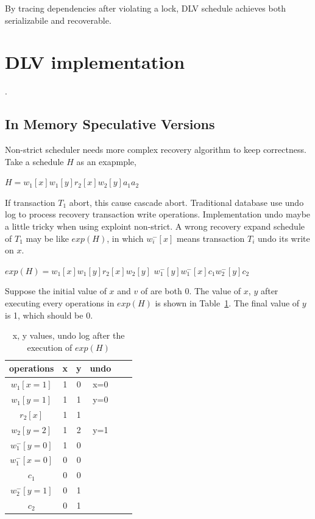 \documentclass[conference]{IEEEtran}
\begin{document}
By tracing dependencies after violating a lock, DLV schedule achieves both serializabile and recoverable.

\section{DLV implementation}.

\subsection {In Memory Speculative Versions}

Non-strict scheduler needs more complex recovery algorithm to keep correctness.
Take a schedule ${H}$ as an exapmple,


\begin{center}
${H = w_1[x]w_1[y]r_2[x]w_2[y]a_1a_2}$

\end{center}

If transaction ${T_1}$ abort, this cause cascade abort.
Traditional database use undo log to process recovery transaction write operations.
Implementation undo maybe a little tricky when using exploint non-strict.
A wrong recovery expand schedule of ${T_1}$ may be like ${exp(H)}$,
in which ${w^-_i[x]}$ means transaction ${T_i}$ undo its write on ${x}$.
\begin{center}
  
  ${exp(H) =  w_1[x]w_1[y]r_2[x]w_2[y]}$
  ${w^-_1[y]w^-_1[x]c_1w^-_2[y]c_2}$
\end{center}
Suppose the initial value of ${x}$ and ${v}$ of are both ${0}$. The value of ${x}$, ${y}$ after executing every operations in $exp(H)$ is shown in Table~\ref{tbl:x_y_vlues}.
The final value of ${y}$ is 1, which should be 0.


\begin{table}[htb]
  \centering
  \begin{tabular}{|c|c|c|c|c|c|}
  \hline
operations & x &  y & undo   \\ 
  \hline
  \hline
  $w_1[x=1]$ & 1 & 0 & x=0  \\ 
  \hline
  $w_1[y=1]$ & 1 & 1 & y=0   \\
  \hline
  $r_2[x]$ & 1 & 1 &    \\
  \hline
  $w_2[y=2]$ & 1 & 2 & y=1  \\
  \hline
  $w^-_1[y=0]$ & 1 & 0 &   \\
  \hline
  $w^-_1[x=0]$ & 0 & 0 &   \\
  \hline

  $c_1$ & 0 & 0 &   \\
  \hline
  $w^-_2[y=1]$ & 0 & 1 &    \\
  \hline
  $c_2$ & 0 & 1 &  \\
  \hline
  \end{tabular}
\caption{x, y values, undo log after the execution of ${exp(H)}$}
\label{tbl:x_y_vlues}
\end{table}
\end{document}
